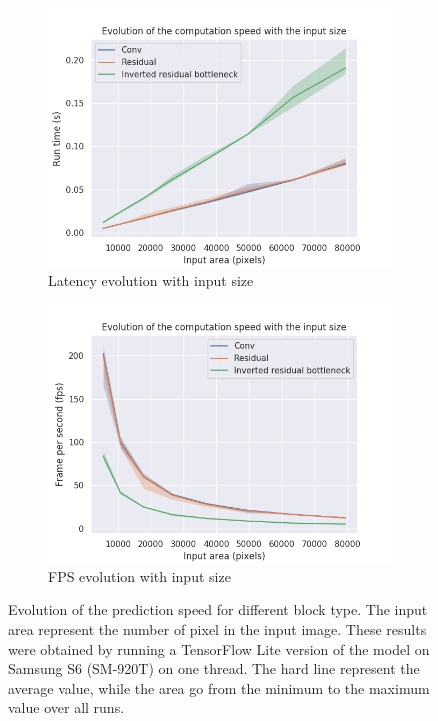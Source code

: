 \begin{figure}
  \begin{center}
    \begin{subfigure}[t]{.49\linewidth}
      \centering
      \includegraphics[width=0.99\linewidth]{figures/speed_by_nn_size_and.png}
      \caption{Latency evolution with input size}
      \label{fig:latencysize}
    \end{subfigure}
    \begin{subfigure}[t]{.49\linewidth}
      \centering
      \includegraphics[width=0.99\linewidth]{figures/speed_by_nn_size_fps_and.png}
      \caption{FPS evolution with input size}
      \label{fig:fpssize}
    \end{subfigure}
    \caption{Evolution of the prediction speed for different block type. The input area represent the number of pixel in the input image. These results were obtained by running a TensorFlow Lite version of the model on Samsung S6 (SM-920T) on one thread. The hard line represent the average value, while the area go from the minimum to the maximum value over all runs.}
    \label{resizeExample}
  \end{center}
\end{figure}

